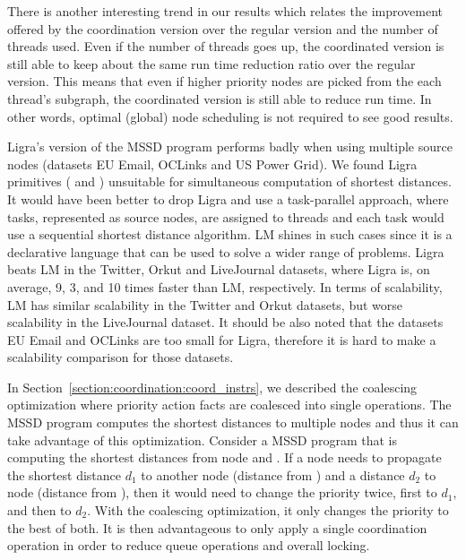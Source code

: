 \begin{figure}[]

        \label{fig:coordination:results_sssp}
\end{figure}

There is another interesting trend in our results which relates the improvement
offered by the coordination version over the regular version and the number of
threads used. Even if the number of threads goes up, the coordinated version is
still able to keep about the same run time reduction ratio over the regular
version. This means that even if higher priority nodes are picked from the each
thread's subgraph, the coordinated version is still able to reduce run time. In
other words, optimal (global) node scheduling is not required to see good
results.

Ligra's version of the MSSD program performs badly when using multiple source
nodes (datasets EU Email, OCLinks and US Power Grid). We found Ligra primitives
( and ) unsuitable for simultaneous computation of
shortest distances. It would have been better to drop Ligra and use a
task-parallel approach, where tasks, represented as source nodes, are assigned
to threads and each task would use a sequential shortest distance algorithm. LM
shines in such cases since it is a declarative language that can be used to
solve a wider range of problems. Ligra beats LM in the Twitter, Orkut and
LiveJournal datasets, where Ligra is, on average, 9, 3, and 10 times faster than
LM, respectively. In terms of scalability, LM has similar scalability in the
Twitter and Orkut datasets, but worse scalability in the LiveJournal dataset. It
should be also noted that the datasets EU Email and OCLinks are too small for
Ligra, therefore it is hard to make a scalability comparison for those datasets.

In Section~\ref{section:coordination:coord_instrs}, we described the coalescing
optimization where priority action facts are coalesced into single operations.
The MSSD program computes the shortest distances to multiple nodes and thus it can
take advantage of this optimization. Consider a MSSD program that is computing
the shortest distances from node  and . If a node 
needs to propagate the shortest distance $d_1$ to another node 
(distance from ) and a distance $d_2$ to node  (distance from
), then it would need to change the priority twice, first to $d_1$, and
then to $d_2$.  With the coalescing optimization, it only changes the priority
to the best of both.  It is then advantageous to only apply a single
coordination operation in order to reduce queue operations and overall locking.

